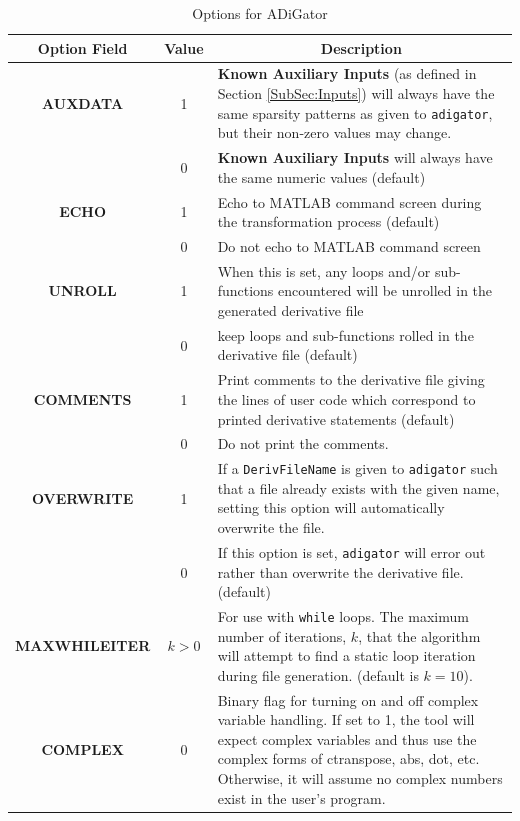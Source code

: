 \documentclass[10pt,pdftex]{article}
\begin{document}
\begin{table}[h]
\caption{Options for ADiGator \label{Tab:Options}}
\center
\begin{tabular}{|c|c|p{12cm}|}
\hline
\multicolumn{1}{|c|}{Option Field} & Value & \multicolumn{1}{c|}{Description}  \\ \hline
{\bf AUXDATA} & 1 & {\bf Known Auxiliary Inputs} (as defined in Section \ref{SubSec:Inputs})  will always have the same sparsity patterns as given to \texttt{adigator}, but their non-zero values may change. 
\\ \cline{2-3}
~ & 0 & {\bf Known Auxiliary Inputs} will always have the same numeric values (default) \\ \hline
{\bf ECHO} & 1 & Echo to MATLAB command screen during the transformation process (default) \\ \cline{2-3}
~ & 0 & Do not echo to MATLAB command screen \\ \hline
{\bf UNROLL} & 1 & When this is set, any loops and/or sub-functions encountered will be unrolled in the generated derivative file \\ \cline{2-3}
~ & 0 & keep loops and sub-functions rolled in the derivative file (default) \\ \hline
{\bf COMMENTS} & 1 & Print  comments to the derivative file giving the lines of user code which correspond to printed derivative statements (default) \\ \cline{2-3} 
~ & 0 & Do not print the comments. \\ \hline
{\bf OVERWRITE} & 1 & If a \texttt{DerivFileName} is given to \texttt{adigator} such that a file already exists with the given name, setting this option will automatically overwrite the file. \\ \cline{2-3} 
~ & 0 & If this option is set, \texttt{adigator} will error out rather than overwrite the derivative file. (default)\\ \hline
{\bf MAXWHILEITER} & $k > 0$ & For use with \texttt{while} loops. The maximum number of iterations, $k$, that the algorithm will attempt to find a static loop iteration during file generation. (default is $k = 10$).\\ \hline
{\bf COMPLEX} & 0 & Binary flag for turning on and off complex variable handling. If set to 1, the tool will expect complex variables and thus use the complex forms of ctranspose, abs, dot, etc. Otherwise, it will assume no complex numbers exist in the user's program.\\ \hline
\end{tabular}
\end{table}
\end{document}
